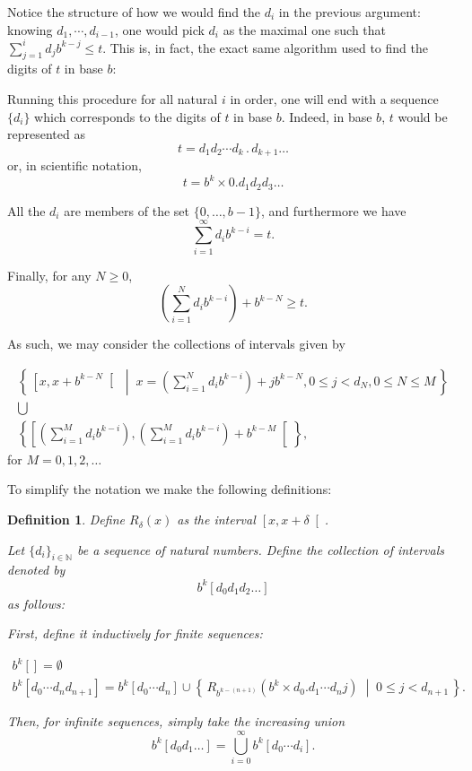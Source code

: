 \documentclass[11pt, reqno]{amsart}
\newcommand{\N}{\mathbb{N}}
\newtheorem{definition}{Definition}
\begin{document}
\bigskip

Notice the structure of how we would find the $d_i$ in the previous argument: knowing $d_1, \cdots, d_{i-1}$, one would pick $d_i$ as the maximal one such that $\sum_{j = 1}^i d_j b^{k-j} \leq t$. This is, in fact, the exact same algorithm used to find the digits of $t$ in base $b$:

\label{digalg}

Running this procedure for all natural $i$ in order, one will end with a sequence $\{d_i\}$ which corresponds to the digits of $t$ in base $b$. Indeed, in base $b$, $t$ would be represented as
\[t = d_1 d_2 \cdots d_k \, . \, d_{k+1} \ldots\]
or, in scientific notation,
\[t = b^k \times 0.d_1 d_2 d_3 \dots \]

All the $d_i$ are members of the set $\{ 0, \dots, b-1\}$, and furthermore we have
\[\sum_{i = 1}^\infty d_i b^{k-i} = t.\]

Finally, for any $N \geq 0$,
\[(\sum_{i=1}^N d_i b^{k-i}) + b^{k-N} \geq t.\]

As such, we may consider the collections of intervals given by

\begin{gather*}
\left\{\, \left[ x , x + b^{k-N} \right[ \;\middle|\; x = \left(\sum_{i=1}^N d_i b^{k-i}\right) + j b^{k-N}, 0 \leq j < d_N, 0 \leq N \leq M\,\right\}\\
\bigcup\\
\left\{\left[ \left(\sum_{i=1}^M d_i b^{k-i}\right) ,\left(\sum_{i=1}^M d_i b^{k-i}\right) + b^{k-M} \right[\right\},
\end{gather*}
for $M = 0, 1, 2, \dots$

To simplify the notation we make the following definitions:

\begin{definition}
Define $R_\delta(x)$ as the interval  $\left[x, x+\delta \right[$.

Let $\{d_i\}_{i \in \N}$ be a sequence of natural numbers. Define the collection of intervals denoted by
\[ b^k [d_0 d_1 d_2 \dots] \]
as follows:

First, define it inductively for finite sequences:

\begin{gather*}
b^k [] = \emptyset\\
b^k [d_0 \cdots d_n d_{n+1}] = b^k [d_0 \cdots d_n] \cup \left\{\, R_{b^{k-(n+1)}}(b^k \times d_0 . d_1 \cdots d_n j) \;\middle|\; 0 \leq j < d_{n+1} \,\right\}.
\end{gather*}

Then, for infinite sequences, simply take the increasing union
\[ b^k[d_0 d_1 \dots] = \bigcup_{i = 0}^\infty b^k[d_0 \cdots d_i].\]

\end{definition}
\end{document}
